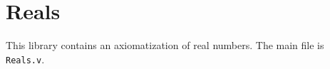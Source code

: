 \section{Reals}\label{Reals}

This library contains an axiomatization of real numbers.
The main file is \texttt{Reals.v}.
